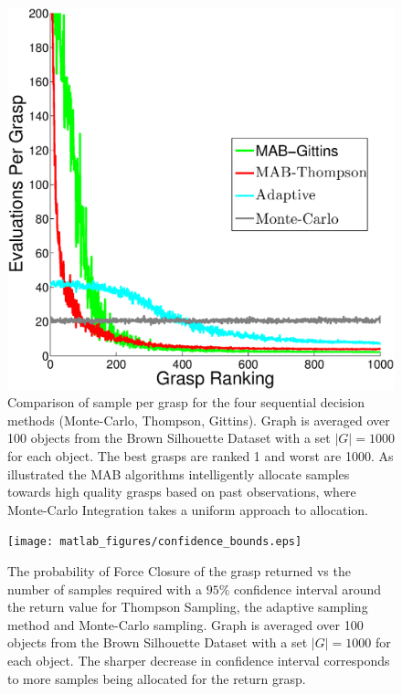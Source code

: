 \documentclass[10pt, conference]{ieeeconf}      %
\begin{document}
\begin{figure}[ht!]
\centering
\includegraphics[scale=0.25]{matlab_figures/pulls_per_grasp.eps}
\caption{ \footnotesize Comparison of sample per grasp for the four sequential decision methods (Monte-Carlo, Thompson, Gittins). Graph is averaged over 100 objects from the Brown Silhouette Dataset \cite{brown} with a set $|G|=1000$ for each object. The best grasps are ranked 1 and worst are 1000. As illustrated the MAB algorithms intelligently allocate samples towards high quality grasps based on past observations, where Monte-Carlo Integration takes a uniform approach to allocation. }

\vspace*{-10pt}
\label{fig:pulls_per_grasp}
\end{figure}

\begin{figure}[ht!]
\centering
\texttt{[image: matlab\_figures/confidence\_bounds.eps]}
\caption{ \footnotesize {} The probability of Force Closure of the grasp returned vs the number of samples required with a $95\%$ confidence interval around the return value for Thompson Sampling, the adaptive sampling method and Monte-Carlo sampling. Graph is averaged over 100 objects from the Brown Silhouette Dataset \cite{brown} with a set $|G|=1000$ for each object. The sharper decrease in confidence interval corresponds to more samples being allocated for the return grasp. }

\vspace*{-10pt}
\label{fig:confidence}
\end{figure}
\end{document}
